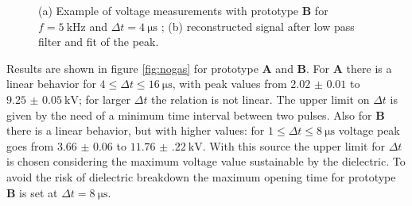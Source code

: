 \begin{figure}
 \centering
 \hfill
 \caption{(a) Example of voltage measurements with prototype \textbf{B} for $f = \SI{5}{\kilo\hertz}$ and $\Delta t = \SI{4}{\micro\second}$ ; (b) reconstructed signal after low pass filter and fit of the peak.}
 \label{fig:tensionpeak}
\end{figure}

Results are shown in figure \ref{fig:nogas} for prototype \textbf{A} and \textbf{B}.
For \textbf{A} there is a linear behavior for $4 \le \Delta t \le \SI{16}{\micro\second}$, with peak values from $\num{2.02(1)}$ to $\SI{9.25(5)}{\kilo\volt}$; for larger $\Delta t$ the relation is not linear. The upper limit on $\Delta t$ is given by the need of a minimum time interval between two pulses.
Also for \textbf{B} there is a linear behavior, but with higher values: for $1 \le \Delta t \le \SI{8}{\micro\second}$ voltage peak goes from $\num{3.66(6)}$ to $\SI{11.76(22)}{\kilo\volt}$. With this source the upper limit for $\Delta t$ is chosen considering the maximum voltage value sustainable by the dielectric. To avoid the risk of dielectric breakdown the maximum opening time for prototype \textbf{B} is set at $\Delta t = \SI{8}{\micro\second}$.


